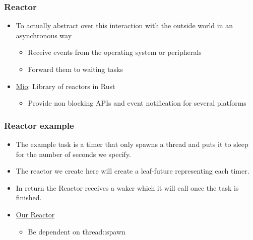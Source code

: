 \begin{frame}[fragile]
    \frametitle{Reactor}
% 
% 
    \begin{itemize}
        \item To actually abstract over this interaction with the outside world in an asynchronous way \pause
    	\begin{itemize}
    	    \item Receive events from the operating system or peripherals
    	    \item Forward them to waiting tasks
    	\end{itemize} \pause

        \item \href{https://github.com/tokio-rs/mio}{Mio}: Library of reactors in Rust \pause
    	\begin{itemize}
    	    \item Provide non blocking APIs and event notification for several platforms
    	\end{itemize}
    \end{itemize}

\end{frame}
\begin{frame}[fragile]
    \frametitle{Reactor example}
% 
    \begin{itemize}
        \item The example task is a {\color{red}timer} that only {\color{red}spawns a thread} and puts it to sleep for the number of seconds we specify. \pause
        \item The reactor we create here will create a {\color{red}leaf-future} representing each timer. \pause
        \item In return the Reactor receives a {\color{red}waker} which it will call once the task is finished. \pause
    \end{itemize}
% 
    \begin{itemize}
        \item \href{https://cfsamson.github.io/books-futures-explained/6_future_example.html}{Our Reactor}
    	\begin{itemize}
    	    \item Be dependent on thread::spawn
    	\end{itemize}
    \end{itemize}

\end{frame}

